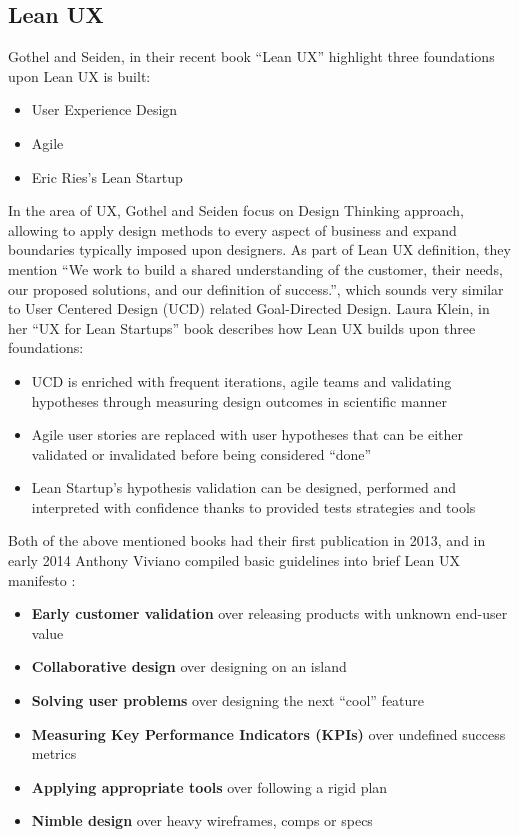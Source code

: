 \documentclass{article}
\begin{document}
\subsection{Lean UX}
Gothel and Seiden, in their recent book ``Lean UX'' \cite{gothelf2016lean} highlight three foundations upon Lean UX is built:
\begin{itemize}
  \item User Experience Design
  \item Agile
  \item Eric Ries's Lean Startup
\end{itemize}
In the area of UX, Gothel and Seiden focus on Design Thinking approach, allowing to apply design methods to every aspect of business and expand boundaries typically imposed upon designers. As part of Lean UX definition, they mention ``We work to build a shared understanding of the customer, their needs, our
proposed solutions, and our definition of success.'', which sounds very similar to User Centered Design (UCD) related Goal-Directed Design.
Laura Klein, in her ``UX for Lean Startups'' \cite{klein2013ux} book describes how Lean UX builds upon three foundations:
\begin{itemize}
  \item UCD is enriched with frequent iterations, agile teams and validating hypotheses through measuring design outcomes in scientific manner
  \item Agile user stories are replaced with user hypotheses that can be either validated or invalidated before being considered ``done''
  \item Lean Startup's hypothesis validation can be designed, performed and interpreted with confidence thanks to provided tests strategies and tools
\end{itemize}
Both of the above mentioned books had their first publication in 2013, and in early 2014 Anthony Viviano compiled basic guidelines into brief Lean UX manifesto \cite{viviano2014lean}:
\begin{itemize}
  \item \textbf{Early customer validation} over releasing products with unknown end-user value
  \item \textbf{Collaborative design} over designing on an island
  \item \textbf{Solving user problems} over designing the next “cool” feature
  \item \textbf{Measuring Key Performance Indicators (KPIs)} over undefined success metrics
  \item \textbf{Applying appropriate tools} over following a rigid plan
  \item \textbf{Nimble design} over heavy wireframes, comps or specs
\end{itemize}
\end{document}
